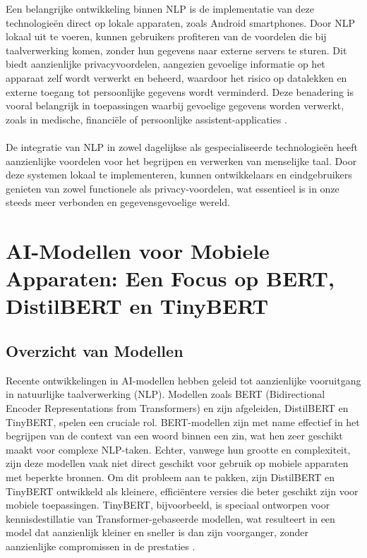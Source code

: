 Een belangrijke ontwikkeling binnen NLP is de implementatie van deze technologieën direct op lokale apparaten, zoals Android smartphones. Door NLP lokaal uit te voeren, kunnen gebruikers profiteren van de voordelen die bij taalverwerking komen, zonder hun gegevens naar externe servers te sturen. Dit biedt aanzienlijke privacyvoordelen, aangezien gevoelige informatie op het apparaat zelf wordt verwerkt en beheerd, waardoor het risico op datalekken en externe toegang tot persoonlijke gegevens wordt verminderd. Deze benadering is vooral belangrijk in toepassingen waarbij gevoelige gegevens worden verwerkt, zoals in medische, financiële of persoonlijke assistent-applicaties \autocite{Locke2021Natural}.
\\ \\
De integratie van NLP in zowel dagelijkse als gespecialiseerde technologieën heeft aanzienlijke voordelen voor het begrijpen en verwerken van menselijke taal. Door deze systemen lokaal te implementeren, kunnen ontwikkelaars en eindgebruikers genieten van zowel functionele als privacy-voordelen, wat essentieel is in onze s\-t\-ee\-ds meer verbonden en gegevensgevoelige wereld.

\section{AI-Modellen voor Mobiele Apparaten: Een Focus op BERT, DistilBERT en TinyBERT}

\subsection{Overzicht van Modellen}

Recente ontwikkelingen in AI-modellen hebben geleid tot aanzienlijke vooruitgang in natuurlijke taalverwerking (NLP). Modellen zoals BERT (Bidirectional Encoder Representations from Transformers) en zijn afgeleiden, DistilBERT en TinyBERT, spelen een cruciale rol. BERT-modellen zijn met name effectief in het begrijpen van de context van een woord binnen een zin, wat hen zeer geschikt maakt voor complexe NLP-taken. Echter, vanwege hun grootte en complexiteit, zijn deze modellen vaak niet direct geschikt voor gebruik op mobiele apparaten met beperkte bronnen. Om dit probleem aan te pakken, zijn DistilBERT en TinyBERT ontwikkeld als kleinere, efficiëntere versies die beter geschikt zijn voor mobiele toepassingen. TinyBERT, bijvoorbeeld, is speciaal ontworpen voor kennisdestillatie van Transformer-gebaseerde modellen, wat resulteert in een model dat aanzienlijk kleiner en sneller is dan zijn voorganger, zonder aanzienlijke compromissen in de prestaties \autocite{Jiao2019TinyBERT}.


